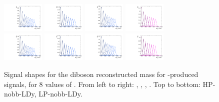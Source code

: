 \begin{figure}[htbp]
  \centering
  \includegraphics[width=0.18\textwidth]{fig/2Dfit/templateSignalVsMX_fromDC_VBFGbuToWW_MVV_mu_HP_nobb_LDy.pdf}
  \includegraphics[width=0.18\textwidth]{fig/2Dfit/templateSignalVsMX_fromDC_VBFRadToWW_MVV_mu_HP_nobb_LDy.pdf}
  \includegraphics[width=0.18\textwidth]{fig/2Dfit/templateSignalVsMX_fromDC_VBFZprToWW_MVV_mu_HP_nobb_LDy.pdf}
  \includegraphics[width=0.18\textwidth]{fig/2Dfit/templateSignalVsMX_fromDC_VBFWprToWZ_MVV_mu_HP_nobb_LDy.pdf}\\
  \includegraphics[width=0.18\textwidth]{fig/2Dfit/templateSignalVsMX_fromDC_VBFGbuToWW_MVV_mu_LP_nobb_LDy.pdf}
  \includegraphics[width=0.18\textwidth]{fig/2Dfit/templateSignalVsMX_fromDC_VBFRadToWW_MVV_mu_LP_nobb_LDy.pdf}
  \includegraphics[width=0.18\textwidth]{fig/2Dfit/templateSignalVsMX_fromDC_VBFZprToWW_MVV_mu_LP_nobb_LDy.pdf}
  \includegraphics[width=0.18\textwidth]{fig/2Dfit/templateSignalVsMX_fromDC_VBFWprToWZ_MVV_mu_LP_nobb_LDy.pdf}\\
  \caption{
    Signal shapes for the diboson reconstructed mass \MVV for \VBF-produced signals, for 8 values of \MX.
    From left to right: \GBulktoWW, \RadtoWW, \ZprtoWW, \WprtoWZ.
    Top to bottom: HP-nobb-LDy, LP-nobb-LDy.
  }
  \label{fig:MVVShapes_VBF_LDy_Run2}
\end{figure}


